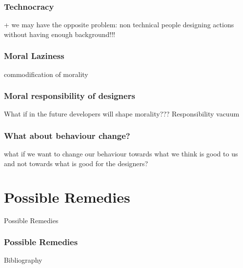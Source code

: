 \documentclass{beamer}
\begin{document}
\begin{frame}
	\frametitle{Technocracy}
 + we may have the opposite problem: non technical people designing actions without having enough background!!!	
\end{frame}

\begin{frame}
\frametitle{Moral Laziness}
commodification of morality
\end{frame}

\begin{frame}
	\frametitle{Moral responsibility of designers}
	What if in the future developers will shape morality??? Responsibility vacuum	
\end{frame}

\begin{frame}
\frametitle{What about behaviour change?}
what if we want to change our behaviour towards what we think is good to us and not towards what is good for the designers?
\end{frame}

\section{Possible Remedies}
\begin{frame}
\begin{center} 
	 Possible Remedies
\end{center}
\end{frame}

\begin{frame}
\frametitle{Possible Remedies}
\end{frame}

\nocite{*}
\begin{frame}{Bibliography}
\renewcommand*{\bibfont}{\small}
\printbibliography
\end{frame}
\end{document}
